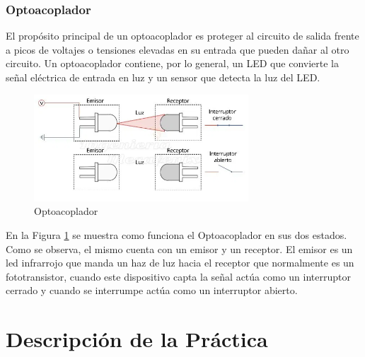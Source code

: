\documentclass[a4paper]{article}
\begin{document}
\subsubsection*{Optoacoplador}

El propósito principal de un optoacoplador es proteger al circuito 
de salida frente a picos de voltajes o tensiones elevadas en su 
entrada que pueden dañar al otro circuito. Un optoacoplador 
contiene, por lo general, un LED que convierte la señal eléctrica 
de entrada en luz y un sensor que detecta la luz del LED.

\begin{figure}[h]\centering
    \includegraphics[height=4cm]{Optoacoplador.png}
    \caption{Optoacoplador}
    \label{fig:Optoacoplador}
\end{figure}

En la Figura \ref{fig:Optoacoplador} se muestra como funciona el 
Optoacoplador en sus dos estados. Como se observa, el mismo 
cuenta con un emisor y un receptor. El emisor es 
un led infrarrojo que manda un haz de luz hacia el receptor que 
normalmente es un fototransistor, cuando este dispositivo capta 
la señal actúa como un interruptor cerrado y cuando se interrumpe 
actúa como un interruptor abierto.

\section{Descripción de la Práctica}
\end{document}

